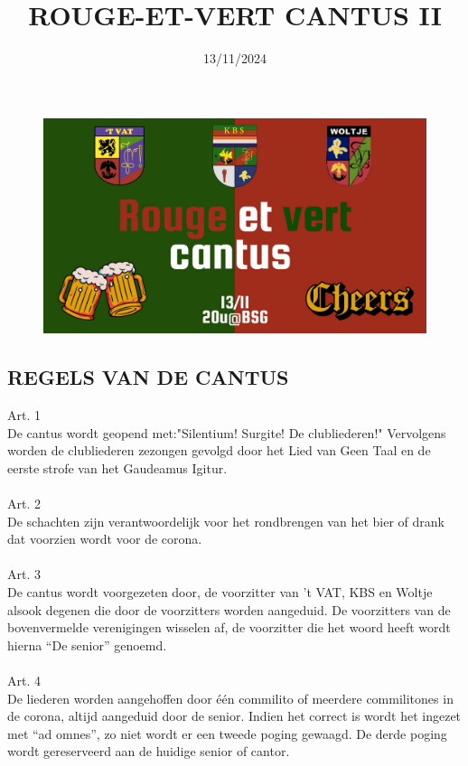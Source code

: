 \documentclass{article}
\title{\textbf{ROUGE-ET-VERT CANTUS II}}
\author{}
\date{\Large 13/11/2024}
\begin{document}
\maketitle
\begin{figure}[h]
    \centering
    \includegraphics[width=\textwidth]{images/banner.jpg}
\end{figure}
\thispagestyle{empty}
\newpage
\begin{center}
  \section*{REGELS VAN DE CANTUS}
\end{center}
Art. 1\\
De cantus wordt geopend met:"Silentium! Surgite! De clubliederen!" Vervolgens worden de clubliederen zezongen gevolgd door het Lied van Geen Taal en de eerste strofe van het Gaudeamus Igitur.\\\\
Art. 2\\
De schachten zijn verantwoordelijk voor het rondbrengen van het bier of drank dat voorzien wordt voor de corona.\\\\
Art. 3\\
De cantus wordt voorgezeten door, de voorzitter van 't VAT, KBS en Woltje alsook degenen die door de voorzitters worden aangeduid. De voorzitters van de bovenvermelde verenigingen wisselen af, de voorzitter die het woord heeft wordt hierna ``De senior'' genoemd.\\\\
Art. 4\\
    De liederen worden aangehoffen door één commilito of meerdere commilitones in de corona, altijd aangeduid door de senior. Indien het correct is wordt het ingezet met ``ad omnes'', zo niet wordt er een tweede poging gewaagd. De derde poging wordt gereserveerd aan de huidige senior of cantor.\\\\
\end{document}
